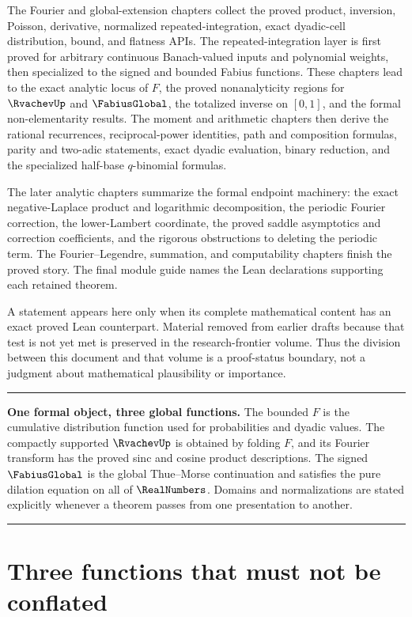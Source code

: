 \documentclass[11pt,oneside]{article}
\theoremstyle{definition}
\theoremstyle{remark}
\newenvironment{boxedremark}{%
  \par\smallskip\noindent\begin{center}\begin{minipage}{0.94\textwidth}%
  \color{black}\hrule\vspace{0.6em}\small
}{%
  \vspace{0.6em}\hrule\end{minipage}\end{center}\smallskip
}
\begin{document}
The Fourier and global-extension chapters collect the proved product, inversion, Poisson,
derivative, normalized repeated-integration, exact dyadic-cell distribution, bound, and
flatness APIs.  The repeated-integration layer is first proved for arbitrary continuous
Banach-valued inputs and polynomial weights, then specialized to the signed and bounded
Fabius functions.  These chapters lead to the exact
analytic locus of \(F\), the proved nonanalyticity regions for \(\RvachevUp\) and \(\FabiusGlobal\),
the totalized inverse on \([0,1]\), and the formal non-elementarity results.  The moment and
arithmetic chapters then derive the rational recurrences, reciprocal-power identities, path
and composition formulas, parity and two-adic statements, exact dyadic evaluation, binary
reduction, and the specialized half-base \(q\)-binomial formulas.

The later analytic chapters summarize the formal endpoint machinery: the exact
negative-Laplace product and logarithmic decomposition, the periodic Fourier correction,
the lower-Lambert coordinate, the proved saddle asymptotics and correction coefficients, and
the rigorous obstructions to deleting the periodic term.  The Fourier--Legendre, summation,
and computability chapters finish the proved story.  The final module guide names the Lean
declarations supporting each retained theorem.

A statement appears here only when its complete mathematical content has an exact proved Lean
counterpart.  Material removed from earlier drafts because that test is not yet met is
preserved in the research-frontier volume.  Thus the division between this document and
that volume is a proof-status boundary, not a judgment about mathematical plausibility
or importance.

\begin{boxedremark}
\textbf{One formal object, three global functions.}
The bounded \(F\) is the cumulative distribution function used for probabilities and
dyadic values.  The compactly supported \(\RvachevUp\) is obtained by folding \(F\), and its Fourier
transform has the proved sinc and cosine product descriptions.  The signed
\(\FabiusGlobal\) is the global Thue--Morse continuation and satisfies the pure dilation
equation on all of \(\RealNumbers\).  Domains and normalizations are stated explicitly whenever a
theorem passes from one presentation to another.
\end{boxedremark}

\section{Three functions that must not be conflated}
\label{sec:three-functions}
\end{document}
